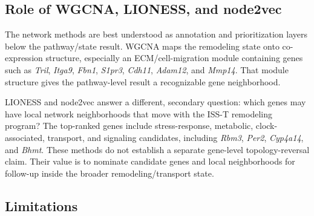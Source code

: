 \documentclass[11pt]{article}
\newcommand{\gene}[1]{\textit{#1}}
\begin{document}
\subsection{Role of WGCNA, LIONESS, and node2vec}

The network methods are best understood as annotation and prioritization layers below the pathway/state result. WGCNA maps the remodeling state onto co-expression structure, especially an ECM/cell-migration module containing genes such as \gene{Tril}, \gene{Itga9}, \gene{Fbn1}, \gene{S1pr3}, \gene{Cdh11}, \gene{Adam12}, and \gene{Mmp14}. That module structure gives the pathway-level result a recognizable gene neighborhood.

LIONESS and node2vec answer a different, secondary question: which genes may have local network neighborhoods that move with the ISS-T remodeling program? The top-ranked genes include stress-response, metabolic, clock-associated, transport, and signaling candidates, including \gene{Rbm3}, \gene{Per2}, \gene{Cyp4a14}, and \gene{Bhmt}. These methods do not establish a separate gene-level topology-reversal claim. Their value is to nominate candidate genes and local neighborhoods for follow-up inside the broader remodeling/transport state.

\subsection{Limitations}
\end{document}

